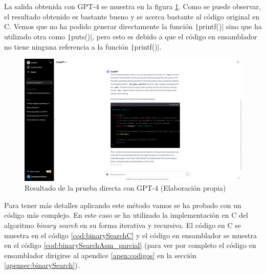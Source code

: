 La salida obtenida con GPT-4 se muestra en la figura \ref{fig:resultado_gpt4_directo}. Como se puede
observar, el resultado obtenido es bastante bueno y se acerca bastante al código original en C. Vemos
que no ha podido generar directamente la función \texttt|printf()| sino que ha utilizado
otra como \texttt|puts()|, pero esto es debido a que el código en ensamblador no tiene
ninguna referencia a la función \texttt|printf()|.

\begin{figure}[H]
    \begin{center}
      \includegraphics[scale=0.3]{figuras/Capitulo_05/ResultadoDirectoGPT4.png}
    \end{center}
    \caption[Resultado de la prueba directa con GPT-4]{Resultado de la prueba directa con GPT-4 (Elaboración propia)}
    \label{fig:resultado_gpt4_directo}
\end{figure}

Para tener más detalles aplicando este método vamos se ha probado con un código más complejo.
En este caso se ha utilizado la implementación en C del algoritmo \textit{binary search} en
su forma iterativa y recursiva. El código en C se muestra en el código \ref{cod:binarySearchC}
y el código en ensamblador se muestra en el código \ref{cod:binarySearchAsm_parcial} (para ver
por completo el código en ensamblador dirigirse al apendice \ref{apen:codigos} en la sección
\ref{apensec:binarySearch}).


